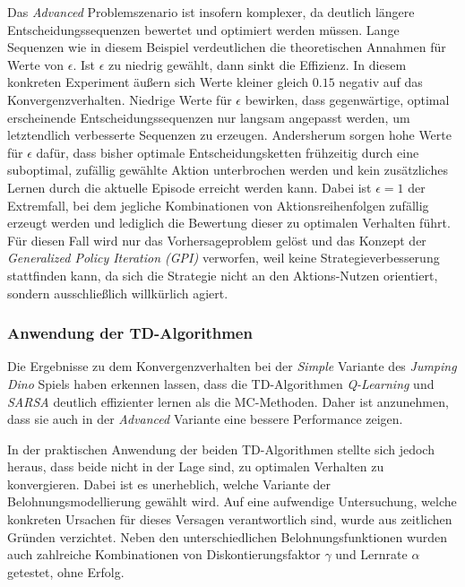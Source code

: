 Das \textit{Advanced} Problemszenario ist insofern komplexer, da deutlich längere Entscheidungssequenzen bewertet und optimiert werden müssen. Lange Sequenzen wie in diesem Beispiel verdeutlichen die theoretischen Annahmen für Werte von $\epsilon$. Ist $\epsilon$ zu niedrig gewählt, dann sinkt die Effizienz. In diesem konkreten Experiment äußern sich Werte kleiner gleich $0.15$ negativ auf das Konvergenzverhalten. Niedrige Werte für $\epsilon$ bewirken, dass gegenwärtige, optimal erscheinende Entscheidungssequenzen nur langsam angepasst werden, um letztendlich verbesserte Sequenzen zu erzeugen. Andersherum sorgen hohe Werte für $\epsilon$ dafür, dass bisher optimale Entscheidungsketten frühzeitig durch eine suboptimal, zufällig gewählte Aktion unterbrochen werden und kein zusätzliches Lernen durch die aktuelle Episode erreicht werden kann. Dabei ist $\epsilon = 1$ der Extremfall, bei dem jegliche Kombinationen von Aktionsreihenfolgen zufällig erzeugt werden und lediglich die Bewertung dieser zu optimalen Verhalten führt. Für diesen Fall wird nur das Vorhersageproblem gelöst und das Konzept der \textit{Generalized Policy Iteration (GPI)} verworfen, weil keine Strategieverbesserung stattfinden kann, da sich die Strategie nicht an den Aktions-Nutzen orientiert, sondern ausschließlich willkürlich agiert.

\subsubsection*{Anwendung der TD-Algorithmen}
Die Ergebnisse zu dem Konvergenzverhalten bei der \textit{Simple} Variante des \textit{Jumping Dino} Spiels haben erkennen lassen, dass die TD-Algorithmen \textit{Q-Learning} und \textit{SARSA} deutlich effizienter lernen als die MC-Methoden. Daher ist anzunehmen, dass sie auch in der \textit{Advanced} Variante eine bessere Performance zeigen.
\par 
In der praktischen Anwendung der beiden TD-Algorithmen stellte sich jedoch heraus, dass beide nicht in der Lage sind, zu optimalen Verhalten zu konvergieren. Dabei ist es unerheblich, welche Variante der Belohnungsmodellierung gewählt wird. Auf eine aufwendige  Untersuchung, welche konkreten Ursachen für dieses Versagen verantwortlich sind, wurde aus zeitlichen Gründen verzichtet. Neben den unterschiedlichen Belohnungsfunktionen wurden auch zahlreiche Kombinationen von Diskontierungsfaktor $\gamma$ und Lernrate $\alpha$ getestet, ohne Erfolg.
\par 

